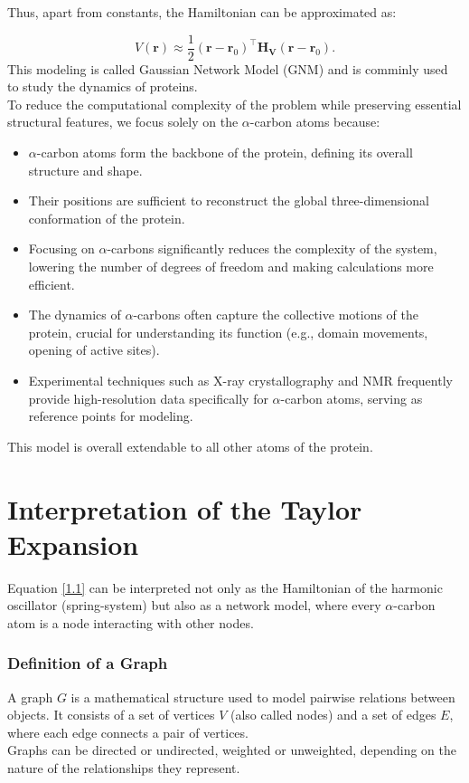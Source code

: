 \documentclass[English, Lau, oneside]{sapthesis}
\begin{document}
Thus, apart from constants, the Hamiltonian can be approximated as:

\begin{equation}
V(\mathbf{r}) \approx \frac{1}{2} (\mathbf{r} - \mathbf{r}_0)^\top \mathbf{H_V} (\mathbf{r} - \mathbf{r}_0). \label{1.1}
\end{equation}
This modeling is called Gaussian Network Model (GNM) and is comminly used to study the dynamics of proteins.\\
To reduce the computational complexity of the problem while preserving essential structural features, we focus solely on the \(\alpha\)-carbon atoms because:

\begin{itemize}
    \item \(\alpha\)-carbon atoms form the backbone of the protein, defining its overall structure and shape.
    \item Their positions are sufficient to reconstruct the global three-dimensional conformation of the protein.
    \item Focusing on \(\alpha\)-carbons significantly reduces the complexity of the system, lowering the number of degrees of freedom and making calculations more efficient.
    \item The dynamics of \(\alpha\)-carbons often capture the collective motions of the protein, crucial for understanding its function (e.g., domain movements, opening of active sites).
    \item Experimental techniques such as X-ray crystallography and NMR frequently provide high-resolution data specifically for \(\alpha\)-carbon atoms, serving as reference points for modeling.
\end{itemize}

This model is overall extendable to all other atoms of the protein.
\newpage

\section{Interpretation of the Taylor Expansion}
\noindent  Equation \eqref{1.1} can be interpreted not only as the Hamiltonian of the harmonic oscillator (spring-system) but also as a network model, where every \(\alpha\)-carbon atom is a node interacting with other nodes.\cite{ref9}

\subsubsection{Definition of a Graph}
\noindent A graph \( G \) is a mathematical structure used to model pairwise relations between objects. It consists of a set of vertices \( V \) (also called nodes) and a set of edges \( E \), where each edge connects a pair of vertices.\cite{ref11}\\
Graphs can be directed or undirected, weighted or unweighted, depending on the nature of the relationships they represent.
\end{document}
